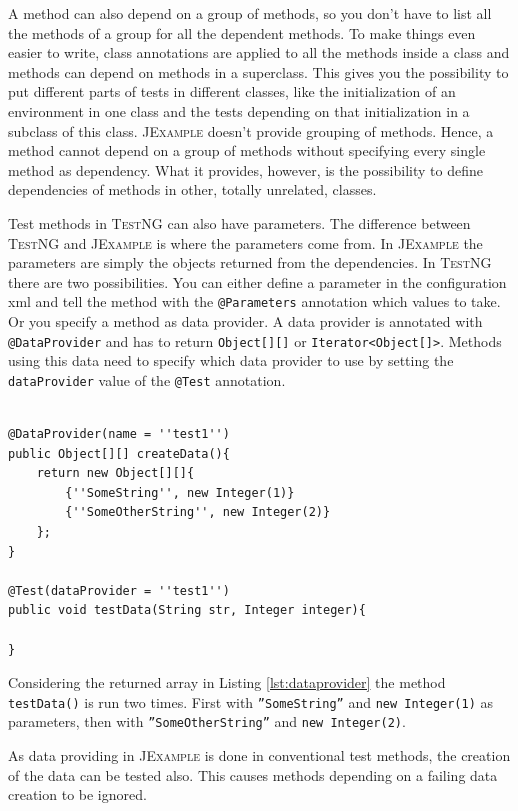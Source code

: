 \documentclass[11pt,a4paper,pdftex]{article}
\makeatletter
\newcommand{\JExample}{\textsc{JExample}\xspace}
\newcommand{\TestNG}{\textsc{TestNG}\xspace}
\newcommand{\ttt}[1]{\texttt{#1}}
\newcommand{\attest}{\ttt{@Test}\xspace}
\makeatother
\begin{document}
A method can also depend on a group of methods, so you don't have to list all the methods of a group for all the dependent methods. To make things even easier to write, class annotations are applied to all the methods inside a class and methods can depend on methods in a superclass. This gives you the possibility to put different parts of tests in different classes, like the initialization of an environment in one class and the tests depending on that initialization in a subclass of this class. \JExample doesn't provide grouping of methods. Hence, a method cannot depend on a group of methods without specifying every single method as dependency. What it provides, however, is the possibility to define dependencies of methods in other, totally unrelated, classes.

Test methods in \TestNG can also have parameters. The difference between \TestNG and \JExample is where the parameters come from. In \JExample the parameters are simply the objects returned from the dependencies. In \TestNG there are two possibilities. You can either define a parameter in the configuration xml and tell the method with the \ttt{@Parameters} annotation which values to take. Or you specify a method as data provider. A data provider is annotated with \ttt{@DataProvider} and has to return \ttt{Object[][]} or \ttt{Iterator<Object[]>}. Methods using this data need to specify which data provider to use by setting the \ttt{dataProvider} value of the \attest annotation.

\begin{lstlisting}[label=lst:dataprovider,caption=Data providing in \TestNG with \ttt{@DataProvider}.]

@DataProvider(name = ''test1'')
public Object[][] createData(){
	return new Object[][]{
		{''SomeString'', new Integer(1)}
		{''SomeOtherString'', new Integer(2)}
	};
}

@Test(dataProvider = ''test1'')
public void testData(String str, Integer integer){

}

\end{lstlisting}

Considering the returned array in Listing \ref{lst:dataprovider} the method \ttt{testData()} is run two times. First with \ttt{''SomeString''} and \ttt{new Integer(1)} as parameters, then with \ttt{''SomeOtherString''} and \ttt{new Integer(2)}.

As data providing in \JExample is done in conventional test methods, the creation of the data can be tested also. This causes methods depending on a failing data creation to be ignored.\\
\end{document}
